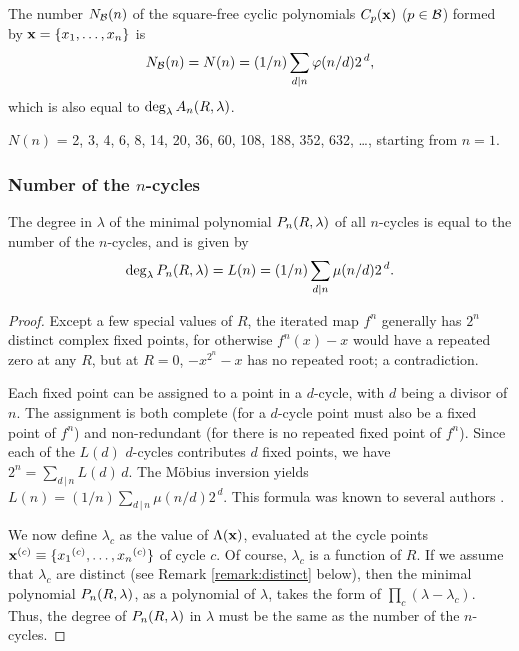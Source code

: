 \documentclass{ws-ijbc}
\begin{document}
\begin{theorem}
The number $N_\mathcal B(n)$ of the square-free cyclic polynomials $C_p(\mathbf{x})$ ($p \in \mathcal B$)
  formed by $\mathbf{x} = \{x_1, \ldots, x_n\}$ is
\begin{equation}
  N_\mathcal B(n) = N(n) = (1/n) \sum_{d|n} \varphi(n/d) 2^{\,d},
\label{eq:necklace}
\end{equation}
%
which is also equal to $\deg_\lambda A_n(R, \lambda)$.
\label{thm:necklace}
\end{theorem}
%
$N(n)$ = 2, 3, 4, 6, 8, 14, 20, 36, 60, 108, 188, 352, 632, \ldots,
  starting from $n = 1$.



\subsubsection{Number of the $n$-cycles}


\begin{theorem}
The degree in $\lambda$ of the minimal polynomial $P_n(R, \lambda)$ of all $n$-cycles
  is equal to the number of the $n$-cycles,
  and is given by
\begin{equation}
  \deg_\lambda P_n(R, \lambda) = L(n) = (1/n)\sum_{d | n} \mu(n/d) 2^{\,d}.
\label{eq:lyndon}
\end{equation}
\label{thm:lyndon}
\end{theorem}



\begin{proof}
Except a few special values of $R$,
the iterated map $f^{n}$ generally
has $2^n$ distinct complex fixed points,
%
for otherwise $f^{n}(x) - x$ would have a repeated zero at any $R$,
  but at $R=0$, $-x^{2^n} - x$ has no repeated root; a contradiction.


Each fixed point can be assigned to
  a point in a $d$-cycle, with $d$ being a divisor of $n$.
%
The assignment
  is both complete (for a $d$-cycle point
  must also be a fixed point of $f^n$)
  and non-redundant (for there is no
  repeated fixed point of $f^n$).
%
Since each of the $L(d)$ $d$-cycles
  contributes $d$ fixed points,
we have
$2^n = \sum_{d\,|\,n} L(d) \, d$.
%
The M\"obius inversion yields $L(n) = (1/n) \sum_{d\,|\,n} \mu(n/d) 2^{\,d}$.
This formula was known to several authors \cite{hao, hao2, lutzky}.

We now define $\lambda_c$ as the value of $\Lambda(\mathbf{x})$,
  evaluated at the cycle points
  $\mathbf{x}^{(c)} \equiv \{ {x_1}^{(c)}, \ldots, {x_n}^{(c)} \}$
  of cycle $c$.
Of course, $\lambda_c$ is a function of $R$.
If we assume that $\lambda_c$ are distinct (see Remark \ref{remark:distinct} below),
  then the minimal polynomial $P_n(R, \lambda)$,
  as a polynomial of $\lambda$,
  takes the form of $\prod_c (\lambda - \lambda_c)$.
Thus, the degree of $P_n(R, \lambda)$ in $\lambda$
  must be the same as the number of the $n$-cycles.
\end{proof}
\end{document}
